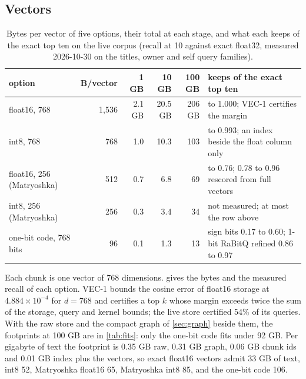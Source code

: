\documentclass[11pt]{article}
\theoremstyle{plain}
\theoremstyle{definition}
\theoremstyle{remark}
\begin{document}
\subsection{Vectors}\label{sec:vectors}
\begin{table}[t]
\centering
\caption{Bytes per vector of five options, their total at each stage, and what each keeps of the
exact top ten on the live corpus (recall at 10 against exact float32, measured 2026-10-30 on the
titles, owner and self query families).}\label{tab:vectors}
\footnotesize
\begin{tabular}{lrrrr>{\raggedright\arraybackslash}p{5.6cm}}
\toprule
option & B/vector & 1 GB & 10 GB & 100 GB & keeps of the exact top ten \\
\midrule
float16, 768 & 1,536 & 2.1 GB & 20.5 GB & 206 GB & 0.999 to 1.000; VEC-1 certifies the margin \\
int8, 768 & 768 & 1.0 & 10.3 & 103 & 0.989 to 0.993; an index beside the float column only \\
float16, 256 (Matryoshka) & 512 & 0.7 & 6.8 & 69 & 0.46 to 0.76; 0.78 to 0.96 rescored from full vectors \\
int8, 256 (Matryoshka) & 256 & 0.3 & 3.4 & 34 & not measured; at most the row above \\
one-bit code, 768 bits & 96 & 0.1 & 1.3 & 13 & sign bits 0.17 to 0.60; 1-bit RaBitQ refined 0.86 to 0.97 \\
\bottomrule
\end{tabular}
\end{table}

Each chunk is one vector of 768 dimensions.  gives the bytes and the measured
recall of each option. VEC-1 bounds the cosine error of float16 storage at $4.884\times10^{-4}$ for
$d=768$ and certifies a top $k$ whose margin exceeds twice the sum of the storage, query and kernel
bounds; the live store certified 54\% of its queries. With the raw store and the compact graph of
\cref{sec:graph} beside them, the footprints at 100 GB are in \cref{tab:fits}: only the one-bit code
fits under 92 GB. Per gigabyte of text the footprint is 0.35 GB raw, 0.31 GB graph, 0.06 GB chunk ids
and 0.01 GB index plus the vectors, so exact float16 vectors admit 33 GB of text, int8 52, Matryoshka
float16 65, Matryoshka int8 85, and the one-bit code 106.
\end{document}
